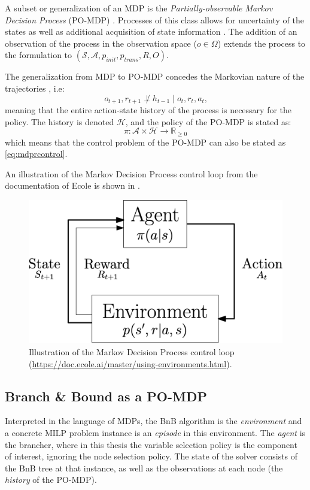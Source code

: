 A subset or generalization of an \gls{MDP} is the \textit{Partially-observable Markov Decision Process }(\gls{PO-MDP}) \cite{monahan1982state}. Processes of this class allows for uncertainty of the states as well as additional acquisition of state information \cite{monahan1982state}.
The addition of an observation of the process in the observation space ($o \in \Omega $) extends the process to the formulation to $ (\mathcal{S}, \mathcal{A}, p_{init}, p_{trans}, R, O)$. 

The generalization from \gls{MDP} to \gls{PO-MDP} concedes the Markovian nature of the trajectories \cite{prouvost2020ecole}, i.e:
\begin{equation}
    o_{t+1},r_{t+1} \not \perp   h_{t-1} \mid o_t,r_t,a_t
\text{,}
\end{equation}
meaning that the entire action-state history of the process is necessary for the policy. The history is denoted $\mathcal{H}$, and the policy of the \gls{PO-MDP} is stated as:
\begin{equation}
    \pi:\mathcal{A} \times \mathcal{H} \to \mathbb{R}_{\geq 0}
\end{equation}
which means that the control problem of the \gls{PO-MDP} can also be stated as \cref{eq:mdprcontrol}. 

An illustration of the Markov Decision Process control loop from the documentation of \gls{Ecole} is shown in .

\begin{figure}
    \centering
    \includegraphics[width=0.45\linewidth]{img/mdp.png}
    \caption{Illustration of the Markov Decision Process control loop (\url{https://doc.ecole.ai/master/using-environments.html}).}
    \label{fig:mdp}
\end{figure}

\subsection{Branch \& Bound as a PO-MDP}

Interpreted in the language of \gls{MDP}s, the \gls{BnB} algorithm is the \textit{environment} and a concrete \gls{MILP} problem instance is an \textit{episode} in this environment. The \textit{agent} is the brancher, where in this thesis the variable selection policy is the component of interest, ignoring the node selection policy. The state of the solver consists of the \gls{BnB} tree at that instance, as well as the observations at each node (the \textit{history} of the \gls{PO-MDP}).

